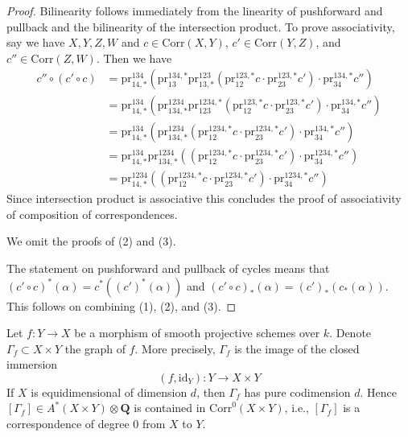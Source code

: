 \begin{proof}
Bilinearity follows immediately from the linearity of pushforward
and pullback and the bilinearity of the intersection product.
To prove associativity, say we have
$X, Y, Z, W$ and $c \in \text{Corr}(X, Y)$, $c' \in \text{Corr}(Y, Z)$, and
$c'' \in \text{Corr}(Z, W)$. Then we have
\begin{align*}
c'' \circ (c' \circ c)
& =
\text{pr}^{134}_{14, *}(
\text{pr}^{134, *}_{13}
\text{pr}^{123}_{13, *}(\text{pr}^{123, *}_{12}c \cdot
\text{pr}^{123, *}_{23}c')
\cdot \text{pr}^{134, *}_{34}c'') \\
& =
\text{pr}^{134}_{14, *}(
\text{pr}^{1234}_{134, *}
\text{pr}^{1234, *}_{123}(\text{pr}^{123, *}_{12}c \cdot
\text{pr}^{123, *}_{23}c')
\cdot \text{pr}^{134, *}_{34}c'') \\
& =
\text{pr}^{134}_{14, *}(
\text{pr}^{1234}_{134, *}
(\text{pr}^{1234, *}_{12}c \cdot
\text{pr}^{1234, *}_{23}c')
\cdot \text{pr}^{134, *}_{34}c'') \\
& =
\text{pr}^{134}_{14, *}
\text{pr}^{1234}_{134, *}
((\text{pr}^{1234, *}_{12}c \cdot
\text{pr}^{1234, *}_{23}c')
\cdot \text{pr}^{1234, *}_{34}c'') \\
& =
\text{pr}^{1234}_{14, *}(
(\text{pr}^{1234, *}_{12}c \cdot
\text{pr}^{1234, *}_{23}c') \cdot
\text{pr}^{1234, *}_{34}c'')
\end{align*}
Since intersection product is associative this concludes the proof
of associativity of composition of correspondences.

\medskip\noindent
We omit the proofs of (2) and (3).

\medskip\noindent
The statement on pushforward and pullback of cycles
means that $(c' \circ c)^*(\alpha) = c^*((c')^*(\alpha))$ and
$(c' \circ c)_*(\alpha) = (c')_*(c_*(\alpha))$.
This follows on combining (1), (2), and (3).
\end{proof}

\begin{example}
\label{example-graph-correspondence}
Let $f : Y \to X$ be a morphism of smooth projective schemes over $k$.
Denote $\Gamma_f \subset X \times Y$ the graph of $f$. More precisely,
$\Gamma_f$ is the image of the closed immersion
$$
(f, \text{id}_Y) : Y \longrightarrow X \times Y
$$
If $X$ is equidimensional of dimension $d$, then $\Gamma_f$
has pure codimension $d$. Hence
$[\Gamma_f] \in A^*(X \times Y) \otimes \mathbf{Q}$
is contained in $\text{Corr}^0(X \times Y)$, i.e., $[\Gamma_f]$
is a correspondence of degree $0$ from $X$ to $Y$.
\end{example}

